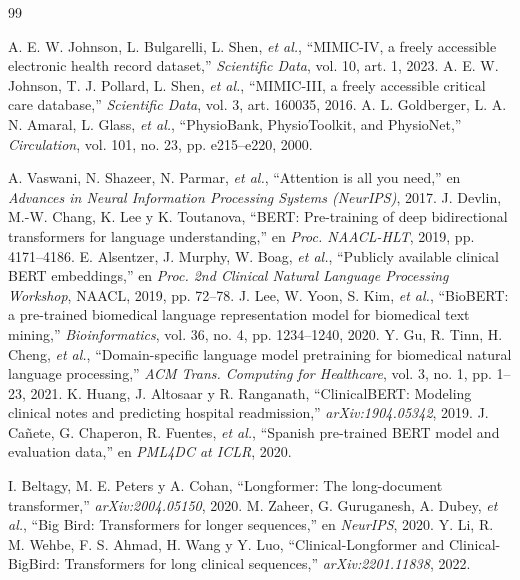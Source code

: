 \documentclass[conference]{IEEEtran}
\begin{document}
\begin{thebibliography}{99}
\footnotesize

 A. E. W. Johnson, L. Bulgarelli, L. Shen, \emph{et al.},
``MIMIC-IV, a freely accessible electronic health record dataset,''
\emph{Scientific Data}, vol. 10, art. 1, 2023.
 A. E. W. Johnson, T. J. Pollard, L. Shen, \emph{et al.},
``MIMIC-III, a freely accessible critical care database,''
\emph{Scientific Data}, vol. 3, art. 160035, 2016.
 A. L. Goldberger, L. A. N. Amaral, L. Glass,
\emph{et al.}, ``PhysioBank, PhysioToolkit, and PhysioNet,''
\emph{Circulation}, vol. 101, no. 23, pp. e215--e220, 2000.

 A. Vaswani, N. Shazeer, N. Parmar, \emph{et al.},
``Attention is all you need,'' en \emph{Advances in Neural Information
Processing Systems (NeurIPS)}, 2017.
 J. Devlin, M.-W. Chang, K. Lee y K. Toutanova, ``BERT:
Pre-training of deep bidirectional transformers for language understanding,''
en \emph{Proc. NAACL-HLT}, 2019, pp. 4171--4186.
 E. Alsentzer, J. Murphy, W. Boag, \emph{et al.},
``Publicly available clinical BERT embeddings,'' en \emph{Proc. 2nd Clinical
Natural Language Processing Workshop}, NAACL, 2019, pp. 72--78.
 J. Lee, W. Yoon, S. Kim, \emph{et al.}, ``BioBERT: a
pre-trained biomedical language representation model for biomedical text
mining,'' \emph{Bioinformatics}, vol. 36, no. 4, pp. 1234--1240, 2020.
 Y. Gu, R. Tinn, H. Cheng, \emph{et al.},
``Domain-specific language model pretraining for biomedical natural language
processing,'' \emph{ACM Trans. Computing for Healthcare}, vol. 3, no. 1,
pp. 1--23, 2021.
 K. Huang, J. Altosaar y R. Ranganath, ``ClinicalBERT:
Modeling clinical notes and predicting hospital readmission,''
\emph{arXiv:1904.05342}, 2019.
 J. Cañete, G. Chaperon, R. Fuentes, \emph{et al.},
``Spanish pre-trained BERT model and evaluation data,'' en \emph{PML4DC at
ICLR}, 2020.

 I. Beltagy, M. E. Peters y A. Cohan, ``Longformer: The
long-document transformer,'' \emph{arXiv:2004.05150}, 2020.
 M. Zaheer, G. Guruganesh, A. Dubey, \emph{et al.}, ``Big
Bird: Transformers for longer sequences,'' en \emph{NeurIPS}, 2020.
 Y. Li, R. M. Wehbe, F. S. Ahmad, H. Wang y Y. Luo,
``Clinical-Longformer and Clinical-BigBird: Transformers for long clinical
sequences,'' \emph{arXiv:2201.11838}, 2022.


\end{thebibliography}
\end{document}
